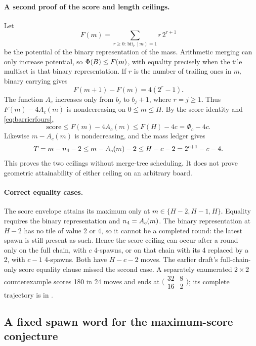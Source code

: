 \paragraph{A second proof of the score and length ceilings.}
Let
\[
F(m)=\sum_{r\ge0:\,\text{bit}_r(m)=1}r\,2^{r+1}
\]
be the potential of the binary representation of the mass. Arithmetic
merging can only increase potential, so $\Phi(B)\le F(m)$, with
equality precisely when the tile multiset is that binary representation.
If $r$ is the number of trailing ones in $m$, binary carrying gives
\[
F(m+1)-F(m)=4(2^r-1).
\]
The function $A_c$ increases only from $b_j$ to $b_j+1$, where $r=j\ge1$.
Thus $F(m)-4A_c(m)$ is nondecreasing on $0\le m\le H$. By the score
identity and \eqref{eq:barrierfours},
\[
\mathrm{score}\le F(m)-4A_c(m)\le F(H)-4c=\Phi_c-4c.
\]
Likewise $m-A_c(m)$ is nondecreasing, and the mass ledger gives
\[
T=m-n_4-2\le m-A_c(m)-2\le H-c-2=2^{c+1}-c-4.
\]
This proves the two ceilings without merge-tree scheduling. It does not
prove geometric attainability of either ceiling on an arbitrary board.

\paragraph{Correct equality cases.}
The score envelope attains its maximum only at $m\in\{H-2,H-1,H\}$.
Equality requires the binary representation and $n_4=A_c(m)$.
The binary representation at $H-2$ has no tile of value 2 or 4, so it
cannot be a completed round: the latest spawn is still present as such.
Hence the score ceiling can occur after a round only on the full chain,
with $c$ 4-spawns, or on that chain with its 4 replaced by a 2, with
$c-1$ 4-spawns. Both have $H-c-2$ moves. The earlier draft's full-chain-only
score equality clause missed the second case. A separately enumerated
$2\times2$ counterexample scores 180 in 24 moves and ends at
$\bigl(\begin{smallmatrix}32&8\\16&2\end{smallmatrix}\bigr)$; its complete
trajectory is in .

\subsection{A fixed spawn word for the maximum-score conjecture}
\label{sec:spawnword}

